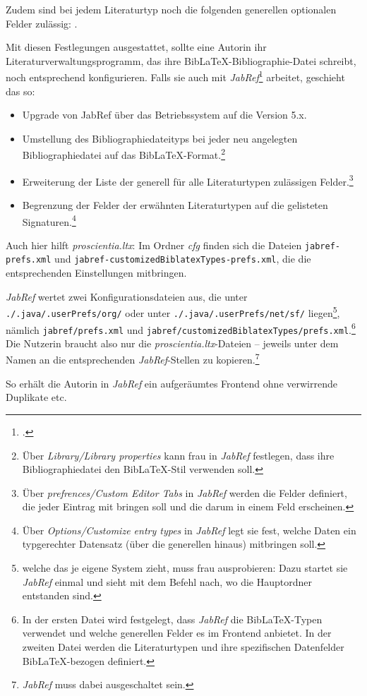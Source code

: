 Zudem sind bei jedem Literaturtyp noch die folgenden generellen optionalen Felder zulässig: .

Mit diesen Festlegungen ausgestattet, sollte eine Autorin ihr Literaturverwaltungsprogramm, das ihre  Bib\LaTeX-Bibliographie-Datei schreibt, noch entsprechend konfigurieren. Falls sie auch mit \emph{JabRef}\footcite[vgl.][wp]{Jabref2019a} arbeitet, geschieht das so:

\begin{itemize}
  \item Upgrade von JabRef über das Betriebssystem auf die Version 5.x.
  \item Umstellung des Bibliographiedateityps bei jeder neu angelegten Bibliographiedatei auf das Bib\LaTeX-Format.\footnote{Über \emph{Library/Library properties} kann frau in \emph{JabRef} festlegen, dass ihre Bibliographiedatei den Bib\LaTeX-Stil verwenden soll.}
  \item Erweiterung der Liste der generell für alle Literaturtypen zulässigen Felder.\footnote{Über \emph{prefrences/Custom Editor Tabs} in \emph{JabRef} werden die Felder definiert, die jeder Eintrag mit bringen soll und die darum in einem Feld erscheinen.}
  \item Begrenzung der Felder der erwähnten Literaturtypen auf die gelisteten Signaturen.\footnote{Über \emph{Options/Customize entry types}  in \emph{JabRef} legt sie fest, welche Daten ein typgerechter Datensatz (über die generellen hinaus) mitbringen soll.}
\end{itemize}

Auch hier hilft \emph{proscientia.ltx}: Im Ordner \emph{cfg} finden sich die Dateien \texttt{jabref-prefs.xml} und \texttt{jabref-customizedBiblatexTypes-prefs.xml}, die die entsprechenden Einstellungen mitbringen.

\emph{JabRef} wertet zwei Konfigurationsdateien aus, die unter \texttt{./.java/.userPrefs/org/} oder unter \texttt{./.java/.userPrefs/net/sf/}  liegen\footnote{welche das je eigene System zieht, muss frau ausprobieren: Dazu startet sie \emph{JabRef} einmal und sieht mit dem Befehl  nach, wo die Hauptordner entstanden sind.}, nämlich \texttt{jabref/prefs.xml} und \texttt{jabref/customizedBiblatexTypes/prefs.xml}.\footnote{In der ersten Datei wird festgelegt, dass \emph{JabRef} die Bib\LaTeX-Typen verwendet und welche generellen Felder es im Frontend anbietet. In der zweiten Datei werden die Literaturtypen und ihre spezifischen Datenfelder Bib\LaTeX-bezogen definiert.} Die Nutzerin braucht also nur die \emph{proscientia.ltx}-Dateien -- jeweils unter dem Namen  an die entsprechenden \emph{JabRef}-Stellen zu kopieren.\footnote{\emph{JabRef} muss dabei ausgeschaltet sein.}

So erhält die Autorin in \emph{JabRef} ein aufgeräumtes Frontend ohne verwirrende Duplikate etc.
%
